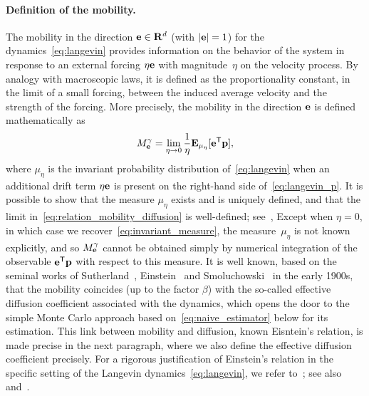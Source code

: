 \documentclass[11pt,a4paper]{article}
\begin{document}
\paragraph{Definition of the mobility.}
The mobility in the direction $\boldsymbol{\mathbf e} \in \mathbf R^d$ (with $|\boldsymbol{\mathbf e}| = 1$)
for the dynamics~\eqref{eq:langevin} provides information on the behavior of the system
in response to an external forcing $\eta \boldsymbol{\mathbf e}$ with magnitude~$\eta$ on the velocity process.
By analogy with macroscopic laws,
it is defined as the proportionality constant,
in the limit of a small forcing,
between the induced average velocity and the strength  of the forcing.
More precisely,
the mobility in the direction $\boldsymbol{\mathbf e}$ is defined mathematically as
\begin{equation}
    \label{eq:relation_mobility_diffusion}
    M^{\gamma}_{\boldsymbol{\mathbf e}} =  \lim_{\eta \to 0} \frac{1}{\eta}\mathbf{E}_{\mu_{\eta}} [\boldsymbol{\mathbf e}^\mathsf T \boldsymbol{\mathbf p}] ,
\end{equation}
where $\mu_{\eta}$ is the invariant probability distribution of~\eqref{eq:langevin} when
an additional drift term $\eta \boldsymbol{\mathbf e}$ is present on the right-hand side of~\eqref{eq:langevin_p}.
It is possible to show that the measure $\mu_{\eta}$ exists and is uniquely defined,
and that the limit in~\eqref{eq:relation_mobility_diffusion} is well-defined;
see~\cite[Section 5]{MR3509213},
Except when $\eta = 0$, in which case we recover~\eqref{eq:invariant_measure},
the measure~$\mu_{\eta}$ is not known explicitly,
and so $M_{\boldsymbol{\mathbf e}}^{\gamma}$ cannot be obtained simply by numerical integration of the observable $\boldsymbol{\mathbf e}^\mathsf T \boldsymbol{\mathbf p}$ with respect to this measure.
It is well known,
based on the seminal works of Sutherland~\cite{sutherland1905lxxv}, Einstein~\cite{einstein1905molekularkinetischen} and Smoluchowski~\cite{von1906kinetischen} in the early 1900s,
that the mobility coincides
(up to the factor $\beta$)
with the so-called effective diffusion coefficient associated with the dynamics,
which opens the door to the simple Monte Carlo approach based on~\eqref{eq:naive_estimator} below for its estimation.
This link between mobility and diffusion,
known Eisntein's relation,
is made precise in the next paragraph,
where we also define the effective diffusion coefficient precisely.
For a rigorous justification of Einstein's relation in the specific setting of the Langevin dynamics~\eqref{eq:langevin},
we refer to~\cite[Section~5.2]{MR3509213}; see also \cite[Section~3]{LMS16} and~\cite[Chapter~9]{pavliotis2011applied}.
\end{document}
